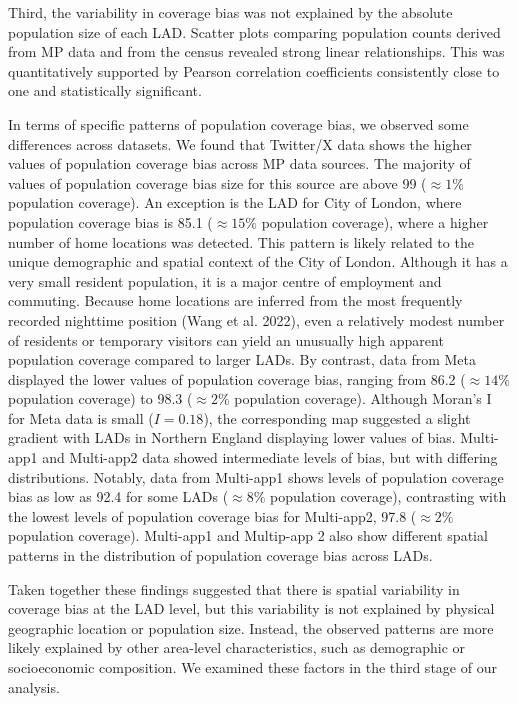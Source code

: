 \documentclass{article}
\begin{document}
Third, the variability in coverage bias was not explained by the
absolute population size of each LAD. Scatter plots comparing population
counts derived from MP data and from the census revealed strong linear
relationships. This was quantitatively supported by Pearson correlation
coefficients consistently close to one and statistically significant.

In terms of specific patterns of population coverage bias, we observed
some differences across datasets. We found that Twitter/X data shows the
higher values of population coverage bias across MP data sources. The
majority of values of population coverage bias size for this source are
above 99 (\(\approx 1 \%\) population coverage). An exception is the LAD
for City of London, where population coverage bias is 85.1
(\(\approx 15 \%\) population coverage), where a higher number of home
locations was detected. This pattern is likely related to the unique
demographic and spatial context of the City of London. Although it has a
very small resident population, it is a major centre of employment and
commuting. Because home locations are inferred from the most frequently
recorded nighttime position (Wang et al. 2022), even a relatively modest number
of residents or temporary visitors can yield an unusually high apparent
population coverage compared to larger LADs. By contrast, data from Meta
displayed the lower values of population coverage bias, ranging from
86.2 (\(\approx 14 \%\) population coverage) to 98.3 (\(\approx 2 \%\)
population coverage). Although Moran's I for Meta data is small
(\(I = 0.18\)), the corresponding map suggested a slight gradient with
LADs in Northern England displaying lower values of bias. Multi-app1 and
Multi-app2 data showed intermediate levels of bias, but with differing
distributions. Notably, data from Multi-app1 shows levels of population
coverage bias as low as 92.4 for some LADs (\(\approx 8 \%\) population
coverage), contrasting with the lowest levels of population coverage
bias for Multi-app2, 97.8 (\(\approx 2\%\) population coverage).
Multi-app1 and Multip-app 2 also show different spatial patterns in the
distribution of population coverage bias across LADs.

Taken together these findings suggested that there is spatial
variability in coverage bias at the LAD level, but this variability is
not explained by physical geographic location or population size.
Instead, the observed patterns are more likely explained by other
area-level characteristics, such as demographic or socioeconomic
composition. We examined these factors in the third stage of our
analysis.
\end{document}
